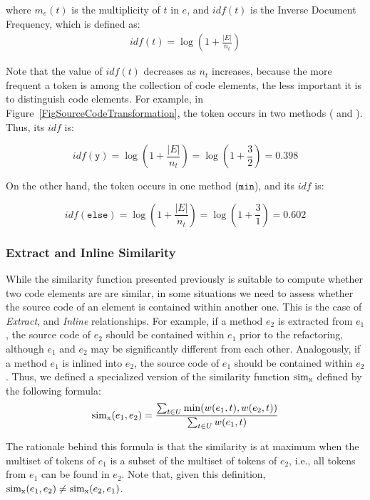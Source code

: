 \noindent where $m_e(t)$ is the multiplicity of $t$ in $e$, and $\mathit{idf}(t)$ is the Inverse Document Frequency, which is defined as:
\begin{align}
\mathit{idf}(t) = \log (1 + \frac{|E|}{n_t})
\end{align}

Note that the value of $\mathit{idf}(t)$ decreases as $n_t$ increases, because the more frequent a token is among the collection of code elements, the less important it is to distinguish code elements.
For example, in Figure~\ref{FigSourceCodeTransformation}, the token  occurs in two methods ( and ). Thus, its $\mathit{idf}$ is:

\[
\mathit{idf}(\mathtt{y}) = 
\log (1 + \frac{|E|}{n_t}) = 
\log (1 + \frac{3}{2}) = 0.398
\]

On the other hand, the token  occurs in one method ($\mathtt{min}$), and its $\mathit{idf}$ is:

\[
\mathit{idf}(\mathtt{else}) = 
\log (1 + \frac{|E|}{n_t}) = 
\log (1 + \frac{3}{1}) = 0.602
\]


\subsubsection{Extract and Inline Similarity}
\label{SecSimX}

While the similarity function presented previously is suitable to compute whether two code elements are are similar, in some situations we need to assess whether the source code of an element is contained within another one. This is the case of \emph{Extract}, and \emph{Inline} relationships. For example, if a method $e_2$ is extracted from $e_1$, the source code of $e_2$ should be contained within $e_1$ prior to the refactoring, although $e_1$ and $e_2$ may be significantly different from each other. Analogously, if a method $e_1$ is inlined into $e_2$, the source code of $e_1$ should be contained within $e_2$.
Thus, we defined a specialized version of the similarity function $\operatorname{sim_{x}}$ defined by the following formula:
\begin{align}
\operatorname{sim_{x}}(e_1, e_2) = \frac{\sum_{t \in U} \min(w(e_1, t), w(e_2, t))}
                        {\sum_{t \in U} w(e_1, t)}
\end{align}

The rationale behind this formula is that the similarity is at maximum when the multiset of tokens of $e_1$ is a subset of the multiset of tokens of $e_2$, i.e., all tokens from $e_1$ can be found in $e_2$. Note that, given this definition, $\operatorname{sim_{x}}(e_1, e_2) \neq \operatorname{sim_{x}}(e_2, e_1)$.


